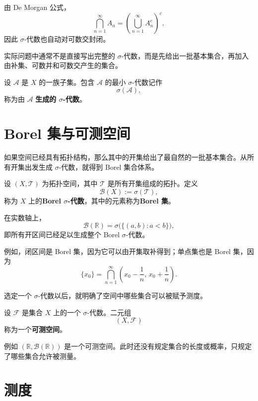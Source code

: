 \documentclass[UTF8,a4paper,11pt,openany]{ctexbook}
\begin{document}
由 De Morgan 公式，
\[
\bigcap_{n=1}^{\infty}A_n
=
\left(
\bigcup_{n=1}^{\infty}A_n^c
\right)^c,
\]
因此 $\sigma$-代数也自动对可数交封闭。

实际问题中通常不是直接写出完整的 $\sigma$-代数，而是先给出一批基本集合，再加入由补集、可数并和可数交产生的集合。

\begin{definition}
设 $\mathcal A$ 是 $X$ 的一族子集。包含 $\mathcal A$ 的最小 $\sigma$-代数记作
\[
\sigma(\mathcal A),
\]
称为由 $\mathcal A$ \textbf{生成的 $\sigma$-代数}。
\end{definition}

\section{Borel 集与可测空间}

如果空间已经具有拓扑结构，那么其中的开集给出了最自然的一批基本集合。从所有开集出发生成 $\sigma$-代数，就得到 Borel 集合体系。

\begin{definition}
设 $(X,\mathcal T)$ 为拓扑空间，其中 $\mathcal T$ 是所有开集组成的拓扑。定义
\[
\mathcal B(X):=\sigma(\mathcal T),
\]
称为 $X$ 上的\textbf{Borel $\sigma$-代数}，其中的元素称为\textbf{Borel 集}。
\end{definition}

在实数轴上，
\[
\mathcal B(\mathbb R)
=
\sigma\bigl(\{(a,b):a<b\}\bigr),
\]
即所有开区间已经足以生成整个 Borel $\sigma$-代数。

例如，闭区间是 Borel 集，因为它可以由开集取补得到；单点集也是 Borel 集，因为
\[
\{x_0\}
=
\bigcap_{n=1}^{\infty}
\left(
x_0-\frac1n,\,
x_0+\frac1n
\right).
\]

选定一个 $\sigma$-代数以后，就明确了空间中哪些集合可以被赋予测度。

\begin{definition}[可测空间]
设 $\mathcal F$ 是集合 $X$ 上的一个 $\sigma$-代数。二元组
\[
(X,\mathcal F)
\]
称为一个\textbf{可测空间}。
\end{definition}

例如 $(\mathbb R,\mathcal B(\mathbb R))$ 是一个可测空间。此时还没有规定集合的长度或概率，只规定了哪些集合允许被测量。

\section{测度}
\end{document}
